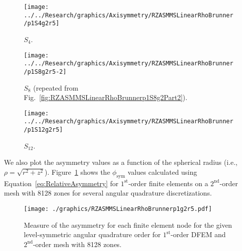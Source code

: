 \documentclass[12pt]{article}
\begin{document}
\begin{sidewaysfigure}[!htb]
\centering
\begin{subfigure}{0.33\textwidth}
\texttt{[image: ../../Research/graphics/Axisymmetry/RZASMMSLinearRhoBrunner/p1S4g2r5]}
\caption{$S_4$.}
\end{subfigure}%
\begin{subfigure}{0.33\textwidth}
\texttt{[image: ../../Research/graphics/Axisymmetry/RZASMMSLinearRhoBrunner/p1S8g2r5-2]}
\caption{$S_8$ (repeated from Fig.~\ref{fig:RZASMMSLinearRhoBrunnerp1S8g2Part2}).}
\end{subfigure}%
\begin{subfigure}{0.33\textwidth}
\texttt{[image: ../../Research/graphics/Axisymmetry/RZASMMSLinearRhoBrunner/p1S12g2r5]}
\caption{$S_{12}$.}
\end{subfigure}
\caption{Relative asymmetry for $p=1$ finite elements on a $2^\text{nd}$-order mesh with 8128 zones; mesh overlay may be removed for clarity.}
\label{fig:RZASMMSLinearRhoBrunnerp1g2r5}
\end{sidewaysfigure}

We also plot the asymmetry values as a function of the spherical radius (i.e., $\rho=\sqrt{r^2+z^2}$). Figure~\ref{fig:RZASMMSLinearRhoBrunnerp1g2r5Nodes} shows the $\phi_\text{sym}$ values calculated using Equation~\ref{eq:RelativeAsymmetry} for $1^\text{st}$-order finite elements on a $2^\text{nd}$-order mesh with 8128 zones for several angular quadrature discretizations.

\begin{figure}[!htb]
\centering
\texttt{[image: ./graphics/RZASMMSLinearRhoBrunnerp1g2r5.pdf]}
\caption{Measure of the asymmetry for each finite element node for the given level-symmetric angular quadrature order for $1^\text{st}$-order DFEM and $2^\text{nd}$-order mesh with 8128 zones.}
\label{fig:RZASMMSLinearRhoBrunnerp1g2r5Nodes}
\end{figure}
\end{document}
